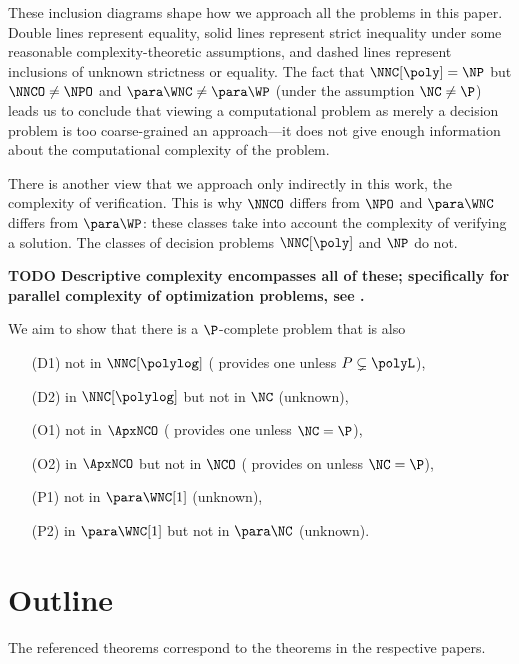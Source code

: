 \documentclass[draft]{article}
\newcommand{\todo}[1]{\textbf{TODO #1}}
\begin{document}
These inclusion diagrams shape how we approach all the problems in this paper.
Double lines represent equality, solid lines represent strict inequality under some reasonable complexity-theoretic assumptions, and dashed lines represent inclusions of unknown strictness or equality.
The fact that $\NNC[\poly] = \NP$ but $\NNCO \neq \NPO$ and $\para \WNC \neq \para \WP$ (under the assumption $\NC \neq \P$) leads us to conclude that viewing a computational problem as merely a decision problem is too coarse-grained an approach---it does not give enough information about the computational complexity of the problem.

There is another view that we approach only indirectly in this work, the complexity of verification.
This is why $\NNCO$ differs from $\NPO$ and $\para \WNC$ differs from $\para \WP$: these classes take into account the complexity of verifying a solution.
The classes of decision problems $\NNC[\poly]$ and $\NP$ do not.

\todo{Descriptive complexity encompasses all of these; specifically for parallel complexity of optimization problems, see \autocite{kt93}.}

We aim to show that there is a $\P$-complete problem that is also
\begin{enumerate}
\item[(D1)] not in $\NNC[\polylog]$ (\autocite[Theorem~3.9]{ncpcp} provides one unless $P \subsetneq \polyL$),
\item[(D2)] in $\NNC[\polylog]$ but not in $\NC$ (unknown),
\item[(O1)] not in $\ApxNCO$ (\autocite[Theorem~3.25]{ncapproximation} provides one unless $\NC = \P$),
\item[(O2)] in $\ApxNCO$ but not in $\NCO$ (\autocite[Theorem~3.25]{ncapproximation} provides on unless $\NC = \P$),
\item[(P1)] not in $\para \WNC[1]$ (unknown),
\item[(P2)] in $\para \WNC[1]$ but not in $\para \NC$ (unknown).
\end{enumerate}

\section{Outline}

The referenced theorems correspond to the theorems in the respective papers.
\end{document}
